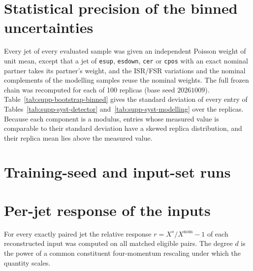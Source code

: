 \documentclass[11pt,a4paper,onecolumn]{article}
\begin{document}


\clearpage


\clearpage
\section{Statistical precision of the binned uncertainties}

Every jet of every evaluated sample was given an independent Poisson weight of unit
mean, except that a jet of \texttt{esup}, \texttt{esdown}, \texttt{cer} or
\texttt{cpos} with an exact nominal partner takes its partner's weight, and the ISR/FSR
variations and the nominal complements of the modelling samples reuse the nominal
weights. The full frozen chain was recomputed for each of 100 replicas (base seed
$20261009$). Table~\ref{tab:supp-bootstrap-binned} gives the standard deviation of every
entry of Tables~\ref{tab:supp-syst-detector} and~\ref{tab:supp-syst-modelling} over the
replicas. Because each component is a modulus, entries whose measured value is
comparable to their standard deviation have a skewed replica distribution, and their
replica mean lies above the measured value.



\section{Training-seed and input-set runs}



\clearpage
\section{Per-jet response of the inputs}

For every exactly paired jet the relative response $r = X^{s}/X^{\mathrm{nom}}-1$ of each
reconstructed input was computed on all matched eligible pairs. The degree $d$ is the
power of a common constituent four-momentum rescaling under which the quantity scales.


\end{document}
